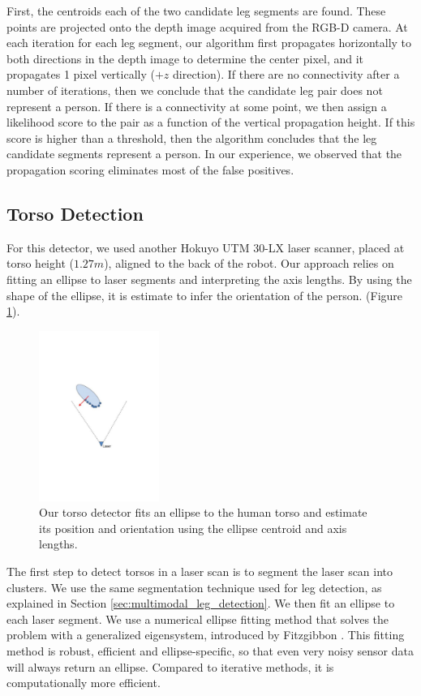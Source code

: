 First, the centroids each of the two candidate leg segments are found.  These points are projected onto the depth image acquired from the RGB-D camera. At each iteration for each leg segment, our algorithm first propagates horizontally to both directions in the depth image to determine the center pixel, and it propagates 1 pixel vertically ($+z$ direction). If there are no connectivity after a number of iterations, then we conclude that the candidate leg pair does not represent a person. If there is a connectivity at some point, we then assign a likelihood score to the pair as a function of the vertical propagation height. If this score is higher than a threshold, then the algorithm concludes that the leg candidate segments represent a person. In our experience, we observed that the propagation scoring eliminates most of the false positives.

\subsection{Torso Detection}
\label{sec:multimodal_torso_detection}

For this detector, we used another Hokuyo UTM 30-LX laser scanner, placed at torso height ($1.27m$), aligned to the back of the robot. Our approach relies on fitting an ellipse to laser segments and interpreting the axis lengths. By using the shape of the ellipse, it is estimate to infer the orientation of the person. (Figure \ref{fig:ellipse}).

\begin{figure}[ht!]
\centering
\includegraphics[width=0.35\textwidth]{pics/ellipse}
\caption{Our torso detector fits an ellipse to the human torso and estimate its position and orientation using the ellipse centroid and axis lengths.}
\label{fig:ellipse}
\end{figure}

The first step to detect torsos in a laser scan is to segment the laser scan into clusters. We use the same segmentation technique used for leg detection, as explained in Section \ref{sec:multimodal_leg_detection}. We then fit an ellipse to each laser segment. We use a numerical ellipse fitting method that solves the problem with a generalized eigensystem, introduced by Fitzgibbon \cite{fitzgibbon1999direct}. This fitting method is robust, efficient and ellipse-specific, so that even very noisy sensor data will always return an ellipse. Compared to iterative methods, it is computationally more efficient.

